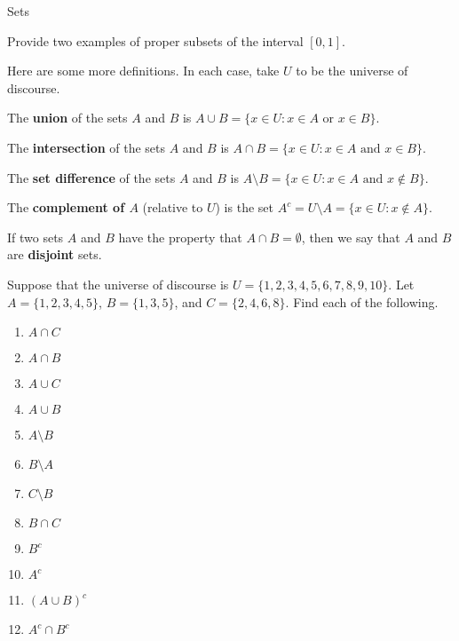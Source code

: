 \begin{section}{Sets}
\begin{exercise}
Provide two examples of proper subsets of the interval $[0,1]$.
\end{exercise}

Here are some more definitions.  In each case, take $U$ to be the universe of discourse.

\begin{definition}
The \textbf{union} of the sets $A$ and $B$ is $A \cup B =\{x\in U : x\in A \mbox{ or } x\in B \}$.
\end{definition}

\begin{definition}
The \textbf{intersection} of the sets $A$ and $B$ is $A \cap B =\{x\in U : x\in A \mbox{ and } x\in B \}$.
\end{definition}

\begin{definition}
The \textbf{set difference} of the sets $A$ and $B$ is $A \setminus B =\{x\in U : x\in A \mbox{ and } x\notin B \}$.
\end{definition}

\begin{definition}
The \textbf{complement of $A$} (relative to $U$) is the set $A^c=U \setminus A =\{x \in U : x \notin A\}$.
\end{definition}

\begin{definition}
If two sets $A$ and $B$ have the property that $A \cap B = \emptyset$, then we say that $A$ and $B$ are \textbf{disjoint} sets.
\end{definition}

\begin{exercise}
Suppose that the universe of discourse is $U=\{1,2,3,4,5,6,7,8,9,10\}$.  Let $A=\{1, 2, 3, 4, 5\}$, $B=\{1, 3, 5\}$, and $C=\{2, 4, 6, 8\}$.  Find each of the following.
\begin{enumerate}
  \item $A \cap C$
  \item $A \cap B$
  \item $A \cup C$
  \item $A \cup B$
  \item $A\setminus B$
  \item $B \setminus A$
  \item $C \setminus B$
  \item $B \cap C$
  \item $B^c$
  \item $A^c$
  \item $(A\cup B)^c$
  \item $A^c\cap B^c$
\end{enumerate}
\end{exercise}


\end{section}
